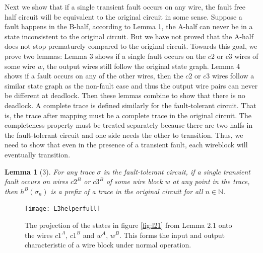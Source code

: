 \documentclass[12pt]{report}
\newtheorem*{lemma}{Lemma}
\begin{document}
Next we show that if a single transient fault occurs on any wire, the fault free half circuit will be equivalent to the original circuit in some sense.  
Suppose a fault happens in the B-half, according to Lemma 1, the A-half can never be in a state inconsistent to the original circuit.  But we have not proved that the A-half does not stop prematurely compared to the original circuit.  Towards this goal, we prove two lemmas:  Lemma 3 shows if a single fault occurs on the $c2$ or $c3$ wires of some wire $w$, the output wires still follow the original state graph.  Lemma 4 shows if a fault occurs on any of the other wires, then the $c2$ or $c3$ wires follow a similar state graph as the non-fault case and thus the output wire pairs can never be different at deadlock.  Then these lemmas combine to show that there is no deadlock.
A complete trace is defined similarly for the fault-tolerant circuit.  That is, the trace after mapping must be a complete trace in the original circuit.  The completeness property must be treated separately because there are two halfs in the fault-tolerant circuit and one side needs the other to transition.  Thus, we need to show that even in the presence of a transient fault, each wireblock will eventually transition. 


\begin{lemma}[3]
For any trace $\sigma$ in the fault-tolerant circuit, if a single transient fault occurs on wires $c2^B$ or $c3^B$ of some wire block $w$ at any point in the trace, then $h^{B}(\sigma_n)$ is a prefix of a trace in the original circuit for all $n \in \mathbb{N}$.
\end{lemma}
\begin{figure}
  \centering
    \texttt{[image: L3helperfull]}
  \caption{The projection of the states in figure \ref{fig:l21} from Lemma 2.1 onto the wires $c1^A$, $c1^B$ and $w^A$, $w^B$.  This forms the input and output characteristic of a wire block under normal operation.}
  \label{fig:l3helper}
\end{figure}
\end{document}
